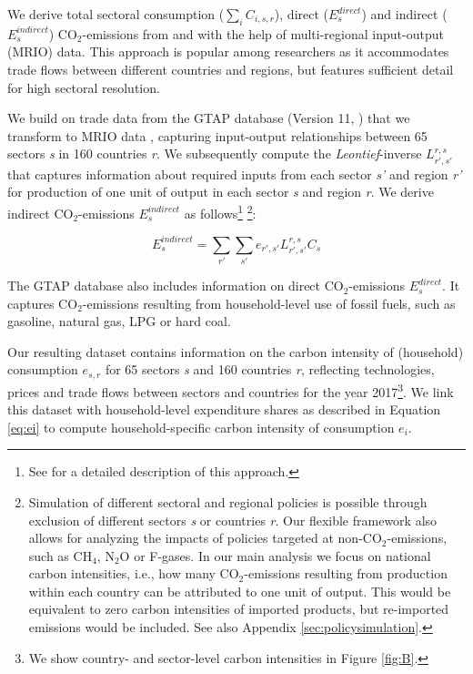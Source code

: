 \documentclass[12pt, a4paper]{article}
\begin{document}
We derive total sectoral consumption ($\sum_{i} C_{i,s,r}$), direct ($E_{s}^{direct}$) and indirect ($E_{s}^{indirect}$) CO$_{2}$-emissions from and with the help of multi-regional input-output (MRIO) data. This approach is popular among researchers as it accommodates trade flows between different countries and regions, but features sufficient detail for high sectoral resolution. 

We build on trade data from the GTAP database (Version 11,  \textcite{Aguiar.2022}) that we transform to MRIO data \autocite{Peters.2011}, capturing input-output relationships between 65 sectors \textit{s} in 160 countries \textit{r}. We subsequently compute the \textit{Leontief}-inverse $L_{r',s'}^{r,s}$ that captures information about required inputs from each sector \textit{s'} and region \textit{r'} for production of one unit of output in each sector \textit{s} and region \textit{r}. We derive indirect CO$_{2}$-emissions $E_{s}^{indirect}$ as follows\footnote{See \textcite{Missbach.2024, Steckel.2021b,Feindt.2021,VogtSchilb.2019} for a detailed description of this approach.} \footnote{Simulation of different sectoral and regional policies is possible through exclusion of different sectors \textit{s} or countries \textit{r}. Our flexible framework also allows for analyzing the impacts of policies targeted at non-CO$_{2}$-emissions, such as CH$_{4}$, N$_{2}$O or F-gases. In our main analysis we focus on national carbon intensities, i.e., how many CO$_{2}$-emissions resulting from production within each country can be attributed to one unit of output. This would be equivalent to zero carbon intensities of imported products, but re-imported emissions would be included. See also Appendix \ref{sec:policysimulation}.}:

\begin{equation}
    E_{s}^{indirect} = \sum_{r'} \sum_{s'} e_{r',s'} L_{r',s'}^{r,s} C_{s}
\end{equation}

The GTAP database also includes information on direct CO$_{2}$-emissions $E_{s}^{direct}$. It captures CO$_{2}$-emissions resulting from household-level use of fossil fuels, such as gasoline, natural gas, LPG or hard coal.

Our resulting dataset contains information on the carbon intensity of (household) consumption $e_{s,r}$ for 65 sectors \textit{s} and 160 countries \textit{r}, reflecting technologies, prices and trade flows between sectors and countries for the year 2017\footnote{We show country- and sector-level carbon intensities in Figure \ref{fig:B}.}. We link this dataset with household-level expenditure shares as described in Equation \ref{eq:ei} to compute household-specific carbon intensity of consumption $e_{i}$.
\end{document}
